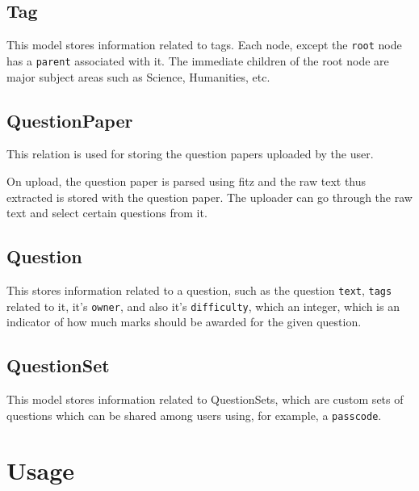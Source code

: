 \documentclass[13pt]{article}
\begin{document}
    \subsection{Tag}
    This model stores information related to tags. Each node, except the \texttt{root} node has a \texttt{parent} associated with it. The immediate children of the root node are major subject areas such as Science, Humanities, etc.\\
    
    \subsection{QuestionPaper}

    This relation is used for storing the question papers uploaded by the user.\par
    On upload, the question paper is parsed using fitz and the raw text thus extracted is stored with the question paper. The uploader can go through the raw text and select certain questions from it.\\
    
    \subsection{Question}

    This stores information related to a question, such as the question \texttt{text}, \texttt{tags} related to it, it's \texttt{owner}, and also it's \texttt{difficulty}, which an integer, which is an indicator of how much marks should be awarded for the given question.\\

    \subsection{QuestionSet}

    This model stores information related to QuestionSets, which are custom sets of questions which can be shared among users using, for example, a \texttt{passcode}.\\
\newpage

\section{Usage}
\end{document}

